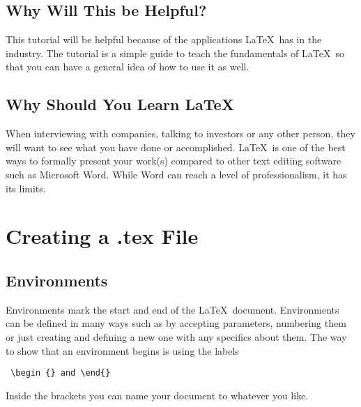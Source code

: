 \documentclass[12pt,journal,compsoc]{IEEEtran}
\begin{document}

\subsection{Why Will This be Helpful?}
This tutorial will be helpful because of the applications \LaTeX\ has in the industry. The tutorial is a simple guide to teach the fundamentals of \LaTeX\ so that you can have a general idea of how to use it as well.



\subsection{Why Should You Learn \LaTeX\-}
When interviewing with companies, talking to investors or any other person, they will want to see what you have done or accomplished. \LaTeX\ is one of the best ways to formally present your work(s) compared to other text editing software such as Microsoft Word. While Word can reach a level of professionalism, it has its limits.



\section{Creating a .tex File}

\subsection{Environments}
Environments mark the start and end of the \LaTeX\ document. Environments can be defined in many ways such as by accepting parameters, numbering them or just creating and defining a new one with any specifics about them. The way to show that an environment begins is using the labels \begin{verbatim} \begin {} and \end{} \end{verbatim}Inside the brackets you can name your document to whatever you like.
\end{document}
